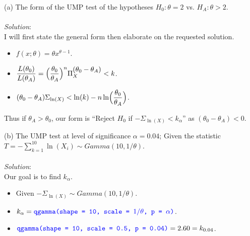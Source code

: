 \documentclass[12pt]{article}
\newcommand{\XB}{\color{black}}
\newcommand{\XBB}{\color{blue}}
\newcommand{\ds}{\displaystyle}
\begin{document}
\XBB\hrulefill\XB 
\vspace{5mm} 

(a) The form of the UMP test of the hypotheses $ H_{0} : \theta = 2 $ vs. $ H_{A} : \theta > 2 $. \\
\vspace{2.5mm} \\
\textit{Solution}:
\vspace{2.5mm} \\

\noindent
I will first state the general form then elaborate on the requested solution. \\

\begin{itemize}
    \item $ \ds f(x; \theta) = \theta x^{\theta - 1} $.
    \item $ \ds \frac{L(\theta_{0})}{L(\theta_{A})} = \Bigl( \frac{\theta_{0}}{\theta_{A}} \Bigr)^{n} \Pi_{X}^{\ds (\theta_{0} - \theta_{A})} < k $.
    \item $ \ds (\theta_{0} - \theta_{A}) \Sigma_{\ln(X)} < \ln(k) - n\ln\Bigl( \frac{\theta_{0}}{\theta_{A}} \Bigr) $.
\end{itemize}

\noindent
Thus if $ \theta_{A} > \theta_{0} $, our form is  ``Reject $ H_{0} $ if $ -\Sigma_{\ln(X)} < k_{\alpha} $'' as $ (\theta_{0} - \theta_{A}) < 0 $. \\

\vspace{2.5mm}

(b) The UMP test at level of significance $ \alpha = 0.04 $; Given the statistic $ \ds T = - \sum_{k=1}^{10} \ln(X_{i}) \sim Gamma(10, 1/\theta) $. \\
\vspace{2.5mm} \\
\textit{Solution}:
\vspace{2.5mm} \\ 

\noindent
Our goal is to find $ k_{\alpha} $. \\

\begin{itemize}
    \item Given $\ds -\Sigma_{\ln(X)} \sim Gamma(10, 1/\theta) $.
    \item $ \ds k_{\alpha} = {\XBB \texttt{qgamma(shape = 10, scale = $ 1 / \theta $, p = $ \alpha $)}} $.
    \item $ \ds {\XBB \texttt{qgamma(shape = 10, scale = 0.5, p = 0.04)}} = 2.60 = k_{0.04} $.
\end{itemize}
\end{document}
